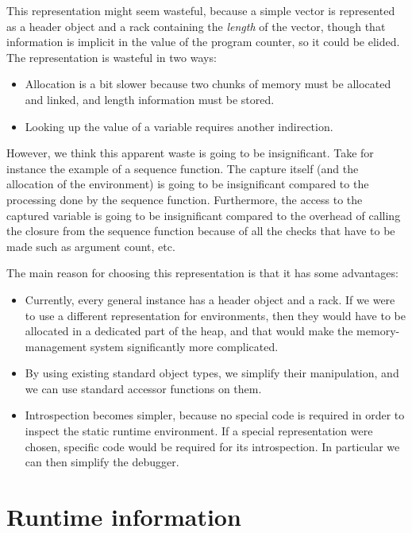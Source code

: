 This representation might seem wasteful, because a simple vector is
represented as a header object and a rack containing the
\emph{length} of the vector, though that information is implicit in
the value of the program counter, so it could be elided.  The
representation is wasteful in two ways:

\begin{itemize}
\item Allocation is a bit slower because two chunks of memory must be
  allocated and linked, and length information must be stored. 
\item Looking up the value of a variable requires another
  indirection. 
\end{itemize}

However, we think this apparent waste is going to be insignificant.
Take for instance the example of a sequence function.  The capture
itself (and the allocation of the environment) is going to be
insignificant compared to the processing done by the sequence
function.  Furthermore, the access to the captured variable is going
to be insignificant compared to the overhead of calling the closure
from the sequence function because of all the checks that have to be
made such as argument count, etc.  

The main reason for choosing this representation is that it has
some advantages:

\begin{itemize}
\item Currently, every general instance has a header object and a
  rack.  If we were to use a different representation for
  environments, then they would have to be allocated in a dedicated
  part of the heap, and that would make the memory-management system
  significantly more complicated.
\item By using existing standard object types, we simplify their
  manipulation, and we can use standard accessor functions on them.
\item Introspection becomes simpler, because no special code is
  required in order to inspect the static runtime environment.  If a
  special representation were chosen, specific code would be required
  for its introspection.  In particular we can then simplify the
  debugger. 
\end{itemize}

\section{Runtime information}

